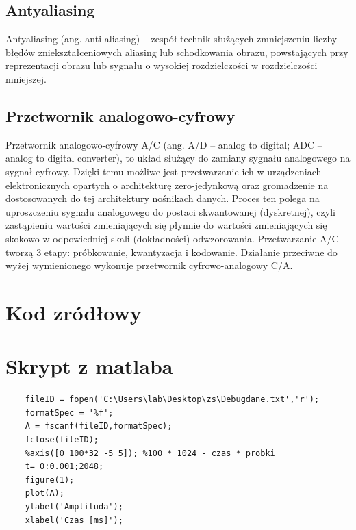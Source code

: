 \documentclass[12pt]{article}
\begin{document}
\subsection{Antyaliasing}
Antyaliasing (ang. anti-aliasing) – zespół technik służących zmniejszeniu liczby błędów zniekształceniowych aliasing lub schodkowania obrazu, powstających przy reprezentacji obrazu lub sygnału o wysokiej rozdzielczości w rozdzielczości mniejszej.\par
\subsection{Przetwornik analogowo-cyfrowy}
Przetwornik analogowo-cyfrowy A/C (ang. A/D – analog to digital; ADC – analog to digital converter), to układ służący do zamiany sygnału analogowego na sygnał cyfrowy. Dzięki temu możliwe jest przetwarzanie ich w urządzeniach elektronicznych opartych o architekturę zero-jedynkową oraz gromadzenie na dostosowanych do tej architektury nośnikach danych. Proces ten polega na uproszczeniu sygnału analogowego do postaci skwantowanej (dyskretnej), czyli zastąpieniu wartości zmieniających się płynnie do wartości zmieniających się skokowo w odpowiedniej skali (dokładności) odwzorowania. Przetwarzanie A/C tworzą 3 etapy: próbkowanie, kwantyzacja i kodowanie. Działanie przeciwne do wyżej wymienionego wykonuje przetwornik cyfrowo-analogowy C/A.\par
\section{Kod zródłowy}
\section{Skrypt z matlaba}
\begin{verbatim}
	fileID = fopen('C:\Users\lab\Desktop\zs\Debugdane.txt','r');
	formatSpec = '%f';
	A = fscanf(fileID,formatSpec);
	fclose(fileID);
	%axis([0 100*32 -5 5]); %100 * 1024 - czas * probki
	t= 0:0.001;2048;
	figure(1);
	plot(A);
	ylabel('Amplituda');
	xlabel('Czas [ms]');
\end{verbatim}
\end{document}
